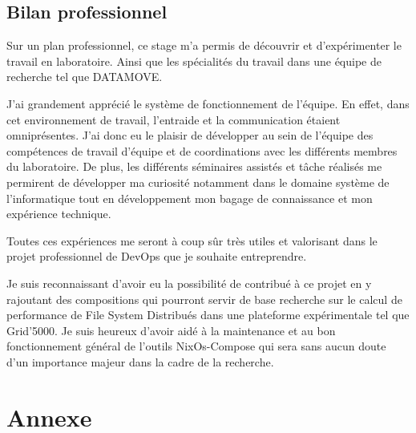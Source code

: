 \documentclass[a4paper,french,12pt, titlepage]{article}
\begin{document}
\hypertarget{bilan-professionnel}{%
\subsection{Bilan professionnel}\label{bilan-professionnel}}

Sur un plan professionnel, ce stage m'a permis de découvrir et
d'expérimenter le travail en laboratoire. Ainsi que les spécialités du
travail dans une équipe de recherche tel que DATAMOVE.

J'ai grandement apprécié le système de fonctionnement de l'équipe. En
effet, dans cet environnement de travail, l'entraide et la communication
étaient omniprésentes. J'ai donc eu le plaisir de développer au sein de
l'équipe des compétences de travail d'équipe et de coordinations avec
les différents membres du laboratoire. De plus, les différents
séminaires assistés et tâche réalisés me permirent de développer ma
curiosité notamment dans le domaine système de l'informatique tout en
développement mon bagage de connaissance et mon expérience technique.

Toutes ces expériences me seront à coup sûr très utiles et valorisant
dans le projet professionnel de DevOps que je souhaite entreprendre.

Je suis reconnaissant d'avoir eu la possibilité de contribué à ce projet
en y rajoutant des compositions qui pourront servir de base recherche
sur le calcul de performance de File System Distribués dans une
plateforme expérimentale tel que Grid'5000. Je suis heureux d'avoir aidé
à la maintenance et au bon fonctionnement général de l'outils
NixOs-Compose qui sera sans aucun doute d'un importance majeur dans la
cadre de la recherche.\newline

\newpage

\hypertarget{annexe}{%
\section{Annexe}\label{annexe}}

\printbibliography

\printglossaries

\newpage
\end{document}
